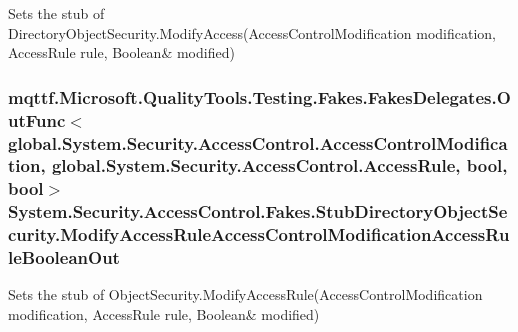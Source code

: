 Sets the stub of Directory\-Object\-Security.\-Modify\-Access(Access\-Control\-Modification modification, Access\-Rule rule, Boolean\& modified)

\hypertarget{class_system_1_1_security_1_1_access_control_1_1_fakes_1_1_stub_directory_object_security_a4f450e6a7f70fd136c33abae302c97e9}{
\subsubsection[{Modify\-Access\-Rule\-Access\-Control\-Modification\-Access\-Rule\-Boolean\-Out}]{\setlength{\rightskip}{0pt plus 5cm}mqttf.\-Microsoft.\-Quality\-Tools.\-Testing.\-Fakes.\-Fakes\-Delegates.\-Out\-Func$<$global.\-System.\-Security.\-Access\-Control.\-Access\-Control\-Modification, global.\-System.\-Security.\-Access\-Control.\-Access\-Rule, bool, bool$>$ System.\-Security.\-Access\-Control.\-Fakes.\-Stub\-Directory\-Object\-Security.\-Modify\-Access\-Rule\-Access\-Control\-Modification\-Access\-Rule\-Boolean\-Out}}\label{class_system_1_1_security_1_1_access_control_1_1_fakes_1_1_stub_directory_object_security_a4f450e6a7f70fd136c33abae302c97e9}


Sets the stub of Object\-Security.\-Modify\-Access\-Rule(Access\-Control\-Modification modification, Access\-Rule rule, Boolean\& modified)

